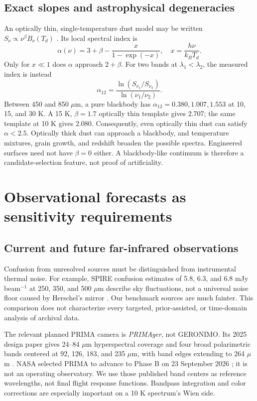 \documentclass[10pt,twocolumn]{article}
\begin{document}
\subsection{Exact slopes and astrophysical degeneracies}
An optically thin, single-temperature dust model may be written
$S_\nu\propto\nu^\beta B_\nu(T_d)$ \cite{Hildebrand1983}. Its
local spectral index is
\begin{equation}
\alpha(\nu)=3+\beta-\frac{x}{1-\exp(-x)},
\quad x=\frac{h\nu}{k_BT_d}.
\end{equation}
Only for $x\ll1$ does $\alpha$ approach $2+\beta$.
For two bands at $\lambda_1<\lambda_2$, the measured index is instead
\begin{equation}
\alpha_{12}=\frac{\ln(S_{\nu_1}/S_{\nu_2})}
 {\ln(\nu_1/\nu_2)}.
\end{equation}
Between 450 and 850 $\mu$m, a pure blackbody has
$\alpha_{12}=0.380,1.007,1.553$ at 10, 15, and 30 K. A 15 K,
$\beta=1.7$ optically thin template gives 2.707; the same template
at 10 K gives 2.080. Consequently, even optically thin dust can satisfy
$\alpha<2.5$. Optically thick dust can approach a blackbody, and
temperature mixtures, grain growth, and redshift broaden the possible
spectra. Engineered surfaces need not have $\beta=0$ either. A
blackbody-like continuum is therefore a candidate-selection feature,
not proof of artificiality.

\section{Observational forecasts as sensitivity requirements}
\subsection{Current and future far-infrared observations}
Confusion from unresolved sources must be distinguished from instrumental
thermal noise. For example, SPIRE confusion estimates of 5.8, 6.3, and
6.8 mJy beam$^{-1}$ at 250, 350, and 500 $\mu$m describe sky fluctuations,
not a universal noise floor caused by Herschel's mirror
\cite{Nguyen2010}. Our benchmark sources are much fainter. This comparison
does not characterize every targeted, prior-assisted, or time-domain
analysis of archival data.

The relevant planned PRIMA camera is \emph{PRIMAger}, not GERONIMO.
Its 2025 design paper gives 24--84 $\mu$m hyperspectral coverage and
four broad polarimetric bands centered at 92, 126, 183, and 235 $\mu$m,
with band edges extending to 264 $\mu$m \cite{Ciesla2025}.
NASA selected PRIMA to advance to Phase B on 23 September 2026
\cite{NASA2026}; it is not an operating observatory. We use those
published band centers as reference wavelengths, not final flight
response functions. Bandpass integration and color corrections are
especially important on a 10 K spectrum's Wien side.
\end{document}

